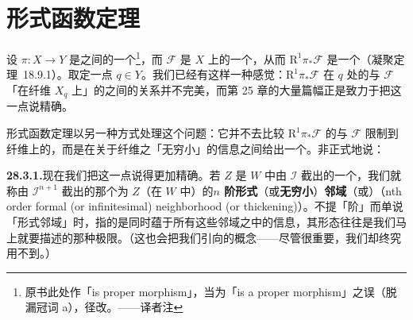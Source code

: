 
\section{形式函数定理}

设 $\pi\colon X\to Y$ 是\trLocally\trNoether{}\trScheme{}之间的一个\trProper\trMorphism\footnote{原书此处作「is proper morphism」，当为「is a proper morphism」之误（脱漏冠词 a），径改。——译者注}，而 $\mathscr{F}$ 是 $X$ 上的一个\trCoherentSheaf，从而 $\mathrm{R}^1\pi_*\mathscr{F}$ 是一个\trCoherentSheaf（\mbox{\trGrothendieck{}凝聚定理~18.9.1}）。取定一点 $q\in Y$。我们已经有这样一种感觉：$\mathrm{R}^1\pi_*\mathscr{F}$ 在 $q$ 处的\trFiber{}与 $\mathscr{F}$「在纤维 $X_q$ 上」的\trCohomology{}之间的关系并不完美，而第 25 章的大量篇幅正是致力于把这一点说精确。

形式函数定理以另一种方式处理这个问题：它并不去比较 $\mathrm{R}^1\pi_*\mathscr{F}$ 的\trFiber{}与 $\mathscr{F}$ 限制到纤维上的\trCohomology，而是在关于纤维之「无穷小\trThickening{}」的信息之间给出一个\trIsomorphism。非正式地说：

\begin{center}
\end{center}

\textbf{28.3.1.}\quad 现在我们把这一点说得更加精确。若 $Z$ 是 $W$ 中由\trIdealSheaf{} $\mathscr{I}$ 截出的一个\trClosedSubscheme，我们就称由 $\mathscr{I}^{n+1}$ 截出的那个\trClosedSubscheme{}为 $Z$（在 $W$ 中）的\textbf{$n$ 阶形式}（或\textbf{无穷小}）\textbf{邻域}（或\textbf{\trThickening{}}）（nth order formal (or infinitesimal) neighborhood (or thickening)）。不提「阶」而单说「形式邻域」时，指的是同时蕴于所有这些邻域之中的信息，其形态往往是我们马上就要描述的那种极限。（这也会把我们引向\trFormalScheme{}的概念——尽管很重要，我们却终究用不到。）

